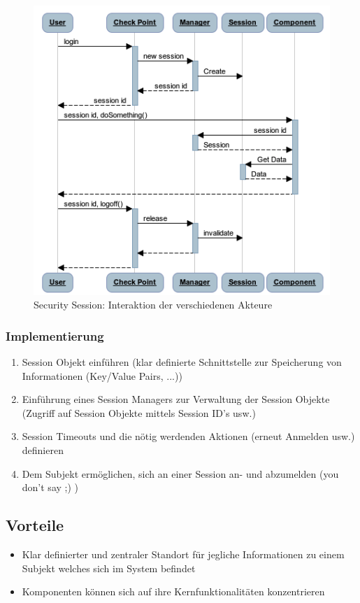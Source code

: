 \begin{figure}
	\centering
	\includegraphics[width=12cm]{content/security/system-access-control-architecture/images/security-session-interaction.png}
	\caption{Security Session: Interaktion der verschiedenen Akteure}
	\label{fig:securitysessioninteraction}
\end{figure}

\subsubsection*{Implementierung}
\begin{enumerate}
	\item Session Objekt einführen (klar definierte Schnittstelle zur Speicherung von Informationen (Key/Value Pairs, ...))
	\item Einführung eines Session Managers zur Verwaltung der Session Objekte (Zugriff auf Session Objekte mittels Session ID's usw.)
	\item Session Timeouts und die nötig werdenden Aktionen (erneut Anmelden usw.) definieren
	\item Dem Subjekt ermöglichen, sich an einer Session an- und abzumelden (you don't say ;) )
\end{enumerate}

\subsection*{Vorteile}
\begin{itemize}
	\item Klar definierter und zentraler Standort für jegliche Informationen zu einem Subjekt welches sich im System befindet
	\item Komponenten können sich auf ihre Kernfunktionalitäten konzentrieren
\end{itemize}

